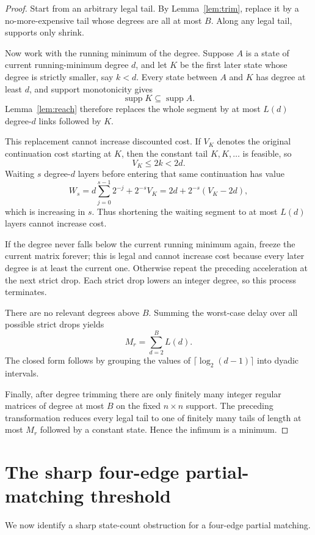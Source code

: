 \documentclass[11pt]{article}
\theoremstyle{definition}
\newcommand{\supp}{\operatorname{supp}}
\begin{document}
\begin{proof}
Start from an arbitrary legal tail.  By Lemma~\ref{lem:trim}, replace it by a no-more-expensive
tail whose degrees are all at most $B$.  Along any legal tail, supports only shrink.

Now work with the running minimum of the degree.  Suppose $A$ is a state of current
running-minimum degree $d$, and let $K$ be the first later state whose degree is strictly smaller,
say $k<d$.  Every state between $A$ and $K$ has degree at least $d$, and support monotonicity gives
\[
\supp K\subseteq\supp A.
\]
Lemma~\ref{lem:reach} therefore replaces the whole segment by at most $L(d)$ degree-$d$ links
followed by $K$.

This replacement cannot increase discounted cost.  If $V_K$ denotes the original continuation
cost starting at $K$, then the constant tail $K,K,\ldots$ is feasible, so
\[
V_K\le2k<2d.
\]
Waiting $s$ degree-$d$ layers before entering that same continuation has value
\[
W_s
=
d\sum_{j=0}^{s-1}2^{-j}+2^{-s}V_K
=
2d+2^{-s}(V_K-2d),
\]
which is increasing in $s$.  Thus shortening the waiting segment to at most $L(d)$ layers cannot
increase cost.

If the degree never falls below the current running minimum again, freeze the current matrix
forever; this is legal and cannot increase cost because every later degree is at least the current
one.  Otherwise repeat the preceding acceleration at the next strict drop.  Each strict drop
lowers an integer degree, so this process terminates.

There are no relevant degrees above $B$.  Summing the worst-case delay over all possible strict
drops yields
\[
M_r=\sum_{d=2}^{B}L(d).
\]
The closed form follows by grouping the values of
$\lceil\log_2(d-1)\rceil$ into dyadic intervals.

Finally, after degree trimming there are only finitely many integer regular matrices of degree at
most $B$ on the fixed $n\times n$ support.  The preceding transformation reduces every legal tail
to one of finitely many tails of length at most $M_r$ followed by a constant state.  Hence the
infimum is a minimum.
\end{proof}

\section{The sharp four-edge partial-matching threshold}
\label{sec:four}

We now identify a sharp state-count obstruction for a four-edge partial matching.
\end{document}
